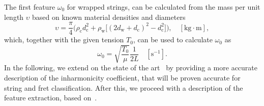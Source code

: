 \documentclass{article}
\begin{document}
\begin{sloppy}

%
%
%
%
%
The first feature $\omega_0$ for wrapped strings, can be calculated from the mass per unit length $\upsilon$ based on known material densities and diameters \cite{firth1984}
\begin{equation}
    \upsilon = \frac{\pi}{4}\Big(\rho_\text{c}d_\text{c}^2 + \rho_\text{w}\big[(2d_\text{w}+d_\text{c})^2-d_\text{c}^2\big]\Big), \quad [\text{kg}\cdot\text{m}],
\end{equation}
which, together with the given tension $T_0$, can be used to calculate $\omega_0$ as
\begin{equation}\label{eq:omega_0}
    \omega_0 = \sqrt{\frac{T_0}{\mu}} \frac{1}{2L} \quad [\text{s}^{-1}].
\end{equation}
In the following, we extend on the state of the art~\cite{rossing:science_of_string_instruments} by providing a more accurate description of %
the inharmonicity coefficient, that will be proven accurate for string and fret classification. %
After this, we proceed with a description of the feature extraction, based on~\cite{hjerrild::icassp19}.
%
%

\end{sloppy}
\end{document}
